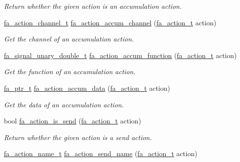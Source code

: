 \begin{DoxyCompactItemize}
\begin{DoxyCompactList}\small\item\em Return whether the given action is an accumulation action. \end{DoxyCompactList}\item 
\hyperlink{group___fa_action_ga042610e7e8a7615937f5eeb3a8d789c5}{fa\-\_\-action\-\_\-channel\-\_\-t} \hyperlink{group___fa_action_ga90c8d6c961998de33f86ef37cc87d302}{fa\-\_\-action\-\_\-accum\-\_\-channel} (\hyperlink{group___fa_action_gadb08ae063168671e5fedc6c23f20ae4b}{fa\-\_\-action\-\_\-t} action)
\begin{DoxyCompactList}\small\item\em Get the channel of an accumulation action. \end{DoxyCompactList}\item 
\hyperlink{group___fa_signal_gaced7eb8d67eb2fe39927934c4abc7255}{fa\-\_\-signal\-\_\-unary\-\_\-double\-\_\-t} \hyperlink{group___fa_action_ga3b28dc4eb7ecaade47a508fa8844bcdb}{fa\-\_\-action\-\_\-accum\-\_\-function} (\hyperlink{group___fa_action_gadb08ae063168671e5fedc6c23f20ae4b}{fa\-\_\-action\-\_\-t} action)
\begin{DoxyCompactList}\small\item\em Get the function of an accumulation action. \end{DoxyCompactList}\item 
\hyperlink{group___fa_ga915ddeae99ad7568b273d2b876425197}{fa\-\_\-ptr\-\_\-t} \hyperlink{group___fa_action_ga0ef7b3178ab057a2d6b64472b866ab9c}{fa\-\_\-action\-\_\-accum\-\_\-data} (\hyperlink{group___fa_action_gadb08ae063168671e5fedc6c23f20ae4b}{fa\-\_\-action\-\_\-t} action)
\begin{DoxyCompactList}\small\item\em Get the data of an accumulation action. \end{DoxyCompactList}\item 
bool \hyperlink{group___fa_action_gacbe7fa1169a98d0c118845e79a48acd9}{fa\-\_\-action\-\_\-is\-\_\-send} (\hyperlink{group___fa_action_gadb08ae063168671e5fedc6c23f20ae4b}{fa\-\_\-action\-\_\-t} action)
\begin{DoxyCompactList}\small\item\em Return whether the given action is a send action. \end{DoxyCompactList}\item 
\hyperlink{group___fa_action_ga44e517a8d2281a0556ac109c2b639d4b}{fa\-\_\-action\-\_\-name\-\_\-t} \hyperlink{group___fa_action_ga061500ae01495bc9cec4c2c58973fcfd}{fa\-\_\-action\-\_\-send\-\_\-name} (\hyperlink{group___fa_action_gadb08ae063168671e5fedc6c23f20ae4b}{fa\-\_\-action\-\_\-t} action)

\end{DoxyCompactItemize}
